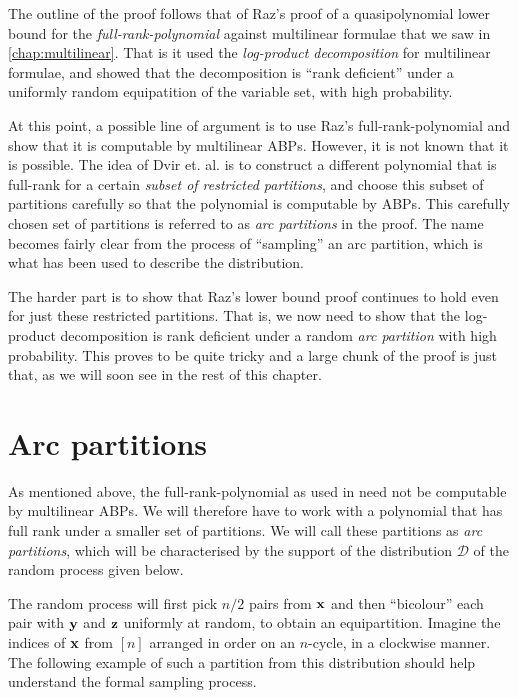 The outline of the proof follows that of Raz's proof \cite{raz2004} of a quasipolynomial lower bound for the \emph{full-rank-polynomial} against multilinear formulae that we saw in \autoref{chap:multilinear}. That is it used the \emph{log-product decomposition} for multilinear formulae, and showed that the decomposition is ``rank deficient'' under a uniformly random equipatition of the variable set, with high probability.

At this point, a possible line of argument is to use Raz's full-rank-polynomial and show that it is computable by multilinear ABPs. However, it is not known that it is possible. The idea of Dvir et. al. is to construct a different polynomial that is full-rank for a certain \emph{subset of restricted partitions}, and choose this subset of partitions carefully so that the polynomial is computable by ABPs. 
This carefully chosen set of partitions is referred to as \emph{arc partitions} in the proof. The name becomes fairly clear from the process of ``sampling'' an arc partition, which is what has been used to describe the distribution.

The harder part is to show that Raz's lower bound proof continues to hold even for just these restricted partitions. That is, we now need to show that the log-product decomposition is rank deficient under a random \emph{arc partition} with high probability. This proves to be quite tricky and a large chunk of the proof is just that, as we will soon see in the rest of this chapter. 

\section{Arc partitions}

As mentioned above, the full-rank-polynomial as used in \cite{raz2004} need not be computable by multilinear ABPs. We will therefore have to work with a polynomial that has full rank under a smaller set of partitions. We will call these partitions as \emph{arc partitions}, which will be characterised by the support of the distribution $\mathcal{D}$ of the random process given below.

The random process will first pick $n/2$ pairs from $\mathbf{x}$ and then ``bicolour'' each pair with $\mathbf{y}$ and $\mathbf{z}$ uniformly at random, to obtain an equipartition. Imagine the indices of $\mathbf{x}$ from $[n]$ arranged in order on an $n$-cycle, in a clockwise manner. The following example of such a partition from this distribution should help understand the formal sampling process. 

